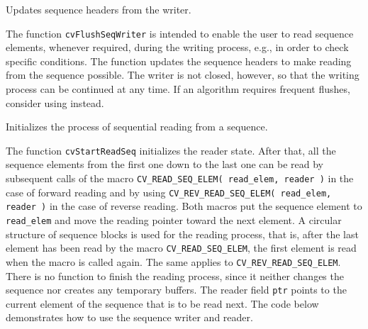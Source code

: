 \label{FlushSeqWriter}

Updates sequence headers from the writer.


\begin{description}
\end{description}

The function \texttt{cvFlushSeqWriter} is intended to enable the user to
read sequence elements, whenever required, during the writing process,
e.g., in order to check specific conditions. The function updates the
sequence headers to make reading from the sequence possible. The writer
is not closed, however, so that the writing process can be continued at
any time. If an algorithm requires frequent flushes, consider using
 instead.

\label{StartReadSeq}

Initializes the process of sequential reading from a sequence.


\begin{description}
\end{description}

The function \texttt{cvStartReadSeq} initializes the reader state. After
that, all the sequence elements from the first one down to the last one
can be read by subsequent calls of the macro
\texttt{CV\_READ\_SEQ\_ELEM( read\_elem, reader )}
in the case of forward reading and by using
\texttt{CV\_REV\_READ\_SEQ\_ELEM( read\_elem, reader )}
in the case of reverse
reading. Both macros put the sequence element to \texttt{read\_elem} and
move the reading pointer toward the next element. A circular structure
of sequence blocks is used for the reading process, that is, after the
last element has been read by the macro \texttt{CV\_READ\_SEQ\_ELEM}, the
first element is read when the macro is called again. The same applies to
\texttt{CV\_REV\_READ\_SEQ\_ELEM}. There is no function to finish the reading
process, since it neither changes the sequence nor creates any temporary
buffers. The reader field \texttt{ptr} points to the current element of
the sequence that is to be read next. The code below demonstrates how
to use the sequence writer and reader.

